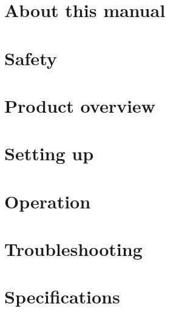 \documentclass[type=manual, lang=en-GB]{plaindoc}   %
\begin{document}
\maketitle
\tableofcontents

\chapter{About this manual}

\chapter{Safety}

\chapter{Product overview}

\chapter{Setting up}

\chapter{Operation}

\chapter{Troubleshooting}

\chapter{Specifications}
\end{document}
